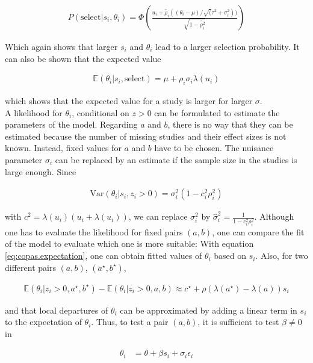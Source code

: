 \documentclass[11pt,a4paper,twoside]{book}\usepackage[]{graphicx}\usepackage[]{color}
\begin{document}
\begin{align}
P(\textrm{select}|s_i, \theta_i) = %
\Phi(\frac{u_i + \tilde{\rho_i}((\theta_i - \mu)/\sqrt(\tau^2 + \sigma_i^2))}{\sqrt{1 - \tilde{\rho_i^2}}}) \nonumber
\end{align}

Which again shows that larger $s_i$ and $\theta_i$ lead to a larger selection probability. It can also be shown that the expected value 

\begin{align}
\mathbb{E}(\theta_i|s_i, \textrm{select}) = \mu + \rho_i\sigma_i\lambda(u_i) \label{eq:copas.expectation}
\end{align}

which shows that the expected value for a study is larger for larger $\sigma$. \\
A likelihood for $\theta_i$, conditional on $z>0$ can be formulated to estimate the parameters of the model. Regarding $a$ and $b$, there is no way that they can be estimated because the number of missing studies and their effect sizes is not known. Instead, fixed values for $a$ and $b$ have to be chosen.
The nuisance parameter $\sigma_i$ can be replaced by an estimate if the sample size in the studies is large enough. Since

\begin{align}
\textrm{Var}(\theta_i| s_i, z_i > 0) = \sigma_i^2 (1 - c_i^2\rho_i^2) \nonumber
\end{align}

with $c^2 = \lambda(u_i)(u_i + \lambda(u_i))$, we can replace $\sigma_i^2$ by $\hat{\sigma}_i^2 = \frac{1}{1-c_i^2\rho_i^2}$. Although one has to evaluate the likelihood for fixed pairs $(a,b)$, one can compare the fit of the model to evaluate which one is more suitable:
With equation \ref{eq:copas.expectation}, one can obtain fitted values of $\theta_i$ based on $s_i$. Also, for two different pairs $(a,b)$, $(a^\star, b^\star)$,

\begin{align}
\mathbb{E}(\theta_i|z_i > 0, a^\star, b^\star) - \mathbb{E}(\theta_i|z_i > 0, a, b) \approx c^\star + \rho(\lambda(a^\star) - \lambda(a))s_i \nonumber
\end{align}

and that local departures of $\theta_i$ can be approximated by adding a linear term in $s_i$ to the expectation of $\theta_i$. Thus, to test a pair $(a,b)$, it is sufficient to test $\beta \neq 0$ in

\begin{align}
\theta_i &= \theta + \beta s_i + \sigma_i \epsilon_i \nonumber
\end{align}
\end{document}
